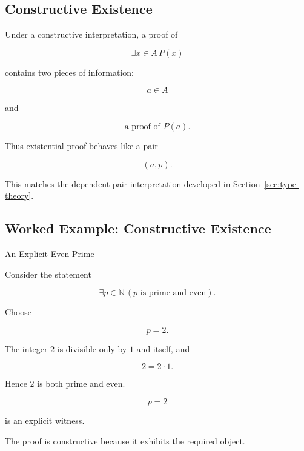 \subsection{Constructive Existence}
\label{subsec:constructive-existence}

Under a constructive interpretation, a proof of

\[
\exists x\in A\,P(x)
\]

contains two pieces of information:

\[
\boxed{
a\in A
}
\]

and

\[
\boxed{
\text{a proof of }P(a).
}
\]

Thus existential proof behaves like a pair

\[
\boxed{
(a,p).
}
\]

This matches the dependent-pair interpretation developed in
Section~\ref{sec:type-theory}.

\subsection{Worked Example: Constructive Existence}
\label{subsec:worked-constructive-existence}

\begin{workedexamplebox}{An Explicit Even Prime}

Consider the statement

\[
\exists p\in\mathbb{N}
\,
(
p\text{ is prime and even}
).
\]

Choose

\[
p=2.
\]

The integer \(2\) is divisible only by \(1\) and itself, and

\[
2=2\cdot1.
\]

Hence \(2\) is both prime and even.

\begin{answerbox}
\[
\boxed{
p=2
}
\]

is an explicit witness.
\end{answerbox}

The proof is constructive because it exhibits the required object.

\end{workedexamplebox}

